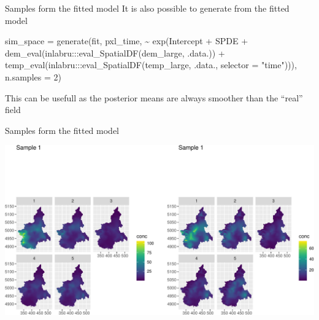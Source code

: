 \documentclass[
  ignorenonframetext,
]{beamer}
\newenvironment{Shaded}{\begin{snugshade}}{\end{snugshade}}
\newcommand{\AttributeTok}[1]{\textcolor[rgb]{0.77,0.63,0.00}{#1}}
\newcommand{\DecValTok}[1]{\textcolor[rgb]{0.00,0.00,0.81}{#1}}
\newcommand{\FunctionTok}[1]{\textcolor[rgb]{0.00,0.00,0.00}{#1}}
\newcommand{\NormalTok}[1]{#1}
\newcommand{\OtherTok}[1]{\textcolor[rgb]{0.56,0.35,0.01}{#1}}
\newcommand{\SpecialCharTok}[1]{\textcolor[rgb]{0.00,0.00,0.00}{#1}}
\newcommand{\StringTok}[1]{\textcolor[rgb]{0.31,0.60,0.02}{#1}}
\begin{document}
\begin{frame}[fragile]{Samples form the fitted model}
\protect\hypertarget{samples-form-the-fitted-model}{}
It is also possible to generate from the fitted model \tiny

\begin{Shaded}
\begin{Highlighting}[]
\NormalTok{sim\_space }\OtherTok{=} \FunctionTok{generate}\NormalTok{(fit, pxl\_time, }
                      \SpecialCharTok{\textasciitilde{}} \FunctionTok{exp}\NormalTok{(Intercept }\SpecialCharTok{+}\NormalTok{ SPDE }\SpecialCharTok{+}
                       \FunctionTok{dem\_eval}\NormalTok{(inlabru}\SpecialCharTok{:::}\FunctionTok{eval\_SpatialDF}\NormalTok{(dem\_large,}
\NormalTok{                                                         .data.)) }\SpecialCharTok{+}
                       \FunctionTok{temp\_eval}\NormalTok{(inlabru}\SpecialCharTok{:::}\FunctionTok{eval\_SpatialDF}\NormalTok{(temp\_large,}
\NormalTok{                                                          .data.,}
                                                          \AttributeTok{selector =} \StringTok{"time"}\NormalTok{))),}
                     \AttributeTok{n.samples =} \DecValTok{2}\NormalTok{)}
\end{Highlighting}
\end{Shaded}

\normalsize

This can be usefull as the posterior means are always smoother than the
``real'' field
\end{frame}

\begin{frame}{Samples form the fitted model}
\protect\hypertarget{samples-form-the-fitted-model-1}{}
\begin{center}\includegraphics[width=0.9\linewidth]{Part3_Spatial_files/figure-beamer/unnamed-chunk-39-1} \end{center}
\end{frame}
\end{document}
